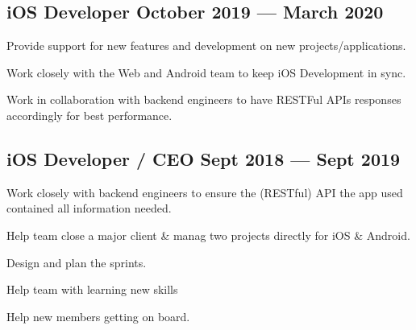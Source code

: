 \documentclass[letter,10pt]{article}
\begin{document}
\subsection{{iOS Developer \hfill October 2019 --- March 2020}}
\begin{zitemize}
\item Provide support for new features and development on new projects/applications.
\item Work closely with the Web and Android team to keep iOS Development in sync.
\item Work in collaboration with backend engineers to have RESTFul APIs responses accordingly for best performance.
\end{zitemize}

\subsection{{iOS Developer / CEO \hfill Sept 2018 --- Sept 2019}}
\begin{zitemize}
\item Work closely with backend engineers to ensure the (RESTful) API the app used contained all information needed.
\item Help team close a major client \& manag two projects directly for iOS \& Android.
\item Design and plan the sprints.
\item Help team with learning new skills
\item Help new members getting on board.
\end{zitemize}
\end{document}
